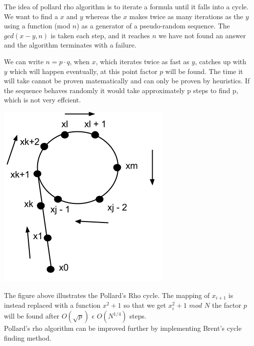 The idea of pollard rho algorithm is to iterate a formula until it falls into a cycle. We want to find a $x$ and $y$ whereas the $x$ makes twice as many iterations as the $y$ using a function (mod $n$) as a generator of a pseudo-random sequence. The $gcd(x - y, n)$ is taken each step, and it reaches $n$ we have not found an answer and the algorithm terminates with a failure.

We can write $n = p \cdot q$, when $x$, which iterates twice as fast as $y$, catches up with $y$ which will happen eventually, at this point factor $p$ will be found. The time it will take cannot be proven matematically and can only be proven by heuristics. If the sequence behaves randomly it would take approximately p steps to find p, which is not very effcient. \cite{avalg} 

\includegraphics[scale = 0.5]{pollards.png}

The figure above illustrates the Pollard's Rho cycle. The mapping of $x_{i+1}$ is instead replaced with a function $x^2+1$ so that we get $x^2_{i}+1$  $mod$ $N$ the factor $p$ will be found after $O(\sqrt{p})$  $\epsilon$ $O(N^{1/4})$ steps. \cite{avalg}\\

Pollard's rho algorithm can be improved further by implementing Brent's cycle finding method. \cite{brent}
